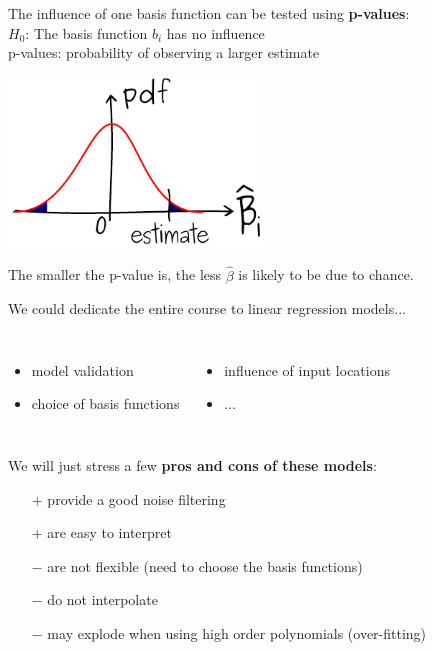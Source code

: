 \documentclass{beamer}
\begin{document}
\begin{frame}{}
The influence of one basis function can be tested using \textbf{p-values}:\\
\qquad $H_0$: The basis function $b_i$ has no influence\\
\qquad p-values: probability of observing a larger estimate
\begin{center}
  \includegraphics[height=4.5cm]{figures/ink_pvalue}
\end{center}
The smaller the p-value is, the less $\hat{\beta}$ is likely to be due to chance.
\end{frame}

\begin{frame}{}
We could dedicate the entire course to linear regression models...
\begin{columns}[c]
\column{5cm}
\begin{itemize}
	\item model validation
	\item choice of basis functions
\end{itemize}
\column{6cm}
\begin{itemize}
	\item influence of input locations
	\item ...
\end{itemize}
\end{columns}
\vspace{10mm}
We will just stress a few \textbf{pros and cons of these models}:
\begin{itemize}
  \item[+] provide a good noise filtering
  \item[+] are easy to interpret
  \item[] \vspace{-5mm}
  \item[$-$] are not flexible (need to choose the basis functions)
  \item[$-$] do not interpolate
  \item[$-$] may explode when using high order polynomials (over-fitting)
\end{itemize}
\end{frame}
\end{document}
